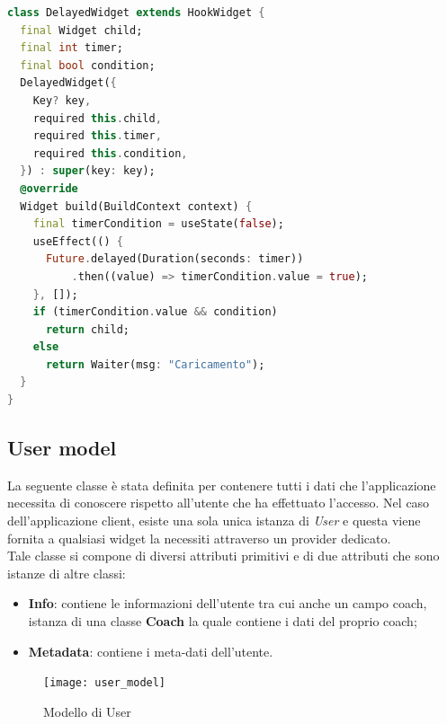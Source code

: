 \begin{lstlisting}[language=dart, firstnumber=1,caption={Classe DelayedWidget}]
class DelayedWidget extends HookWidget {
  final Widget child;
  final int timer;
  final bool condition;
  DelayedWidget({
    Key? key,
    required this.child,
    required this.timer,
    required this.condition,
  }) : super(key: key);
  @override
  Widget build(BuildContext context) {
    final timerCondition = useState(false);
    useEffect(() {
      Future.delayed(Duration(seconds: timer))
          .then((value) => timerCondition.value = true);
    }, []);
    if (timerCondition.value && condition)
      return child;
    else
      return Waiter(msg: "Caricamento");
  }
}
\end{lstlisting}

\subsection{User model}
La seguente classe è stata definita per contenere tutti i dati che l'applicazione necessita di conoscere rispetto all'utente che ha effettuato l'accesso. Nel caso dell'applicazione client, esiste una sola unica istanza di \textit{User} e questa viene fornita a qualsiasi widget la necessiti attraverso un provider dedicato.\\
Tale classe si compone di diversi attributi primitivi e di due attributi che sono istanze di altre classi:
\begin{itemize}
    \item \textbf{Info}: contiene le informazioni dell'utente tra cui anche un campo coach, istanza di una classe \textbf{Coach} la quale contiene i dati del proprio coach;
    \item \textbf{Metadata}: contiene i meta-dati dell'utente.
\end{itemize}
\begin{figure}[h]
    \centering
    \texttt{[image: user\_model]}
    \caption{Modello di User}
\end{figure}
